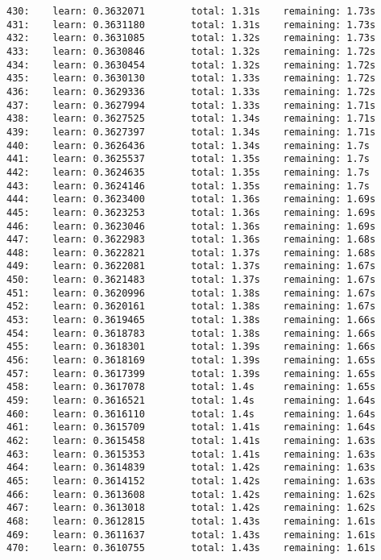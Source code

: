 \documentclass[11pt]{article}
\begin{document}
\begin{Verbatim}[commandchars=\\\{\}]
430:    learn: 0.3632071        total: 1.31s    remaining: 1.73s
431:    learn: 0.3631180        total: 1.31s    remaining: 1.73s
432:    learn: 0.3631085        total: 1.32s    remaining: 1.73s
433:    learn: 0.3630846        total: 1.32s    remaining: 1.72s
434:    learn: 0.3630454        total: 1.32s    remaining: 1.72s
435:    learn: 0.3630130        total: 1.33s    remaining: 1.72s
436:    learn: 0.3629336        total: 1.33s    remaining: 1.72s
437:    learn: 0.3627994        total: 1.33s    remaining: 1.71s
438:    learn: 0.3627525        total: 1.34s    remaining: 1.71s
439:    learn: 0.3627397        total: 1.34s    remaining: 1.71s
440:    learn: 0.3626436        total: 1.34s    remaining: 1.7s
441:    learn: 0.3625537        total: 1.35s    remaining: 1.7s
442:    learn: 0.3624635        total: 1.35s    remaining: 1.7s
443:    learn: 0.3624146        total: 1.35s    remaining: 1.7s
444:    learn: 0.3623400        total: 1.36s    remaining: 1.69s
445:    learn: 0.3623253        total: 1.36s    remaining: 1.69s
446:    learn: 0.3623046        total: 1.36s    remaining: 1.69s
447:    learn: 0.3622983        total: 1.36s    remaining: 1.68s
448:    learn: 0.3622821        total: 1.37s    remaining: 1.68s
449:    learn: 0.3622081        total: 1.37s    remaining: 1.67s
450:    learn: 0.3621483        total: 1.37s    remaining: 1.67s
451:    learn: 0.3620996        total: 1.38s    remaining: 1.67s
452:    learn: 0.3620161        total: 1.38s    remaining: 1.67s
453:    learn: 0.3619465        total: 1.38s    remaining: 1.66s
454:    learn: 0.3618783        total: 1.38s    remaining: 1.66s
455:    learn: 0.3618301        total: 1.39s    remaining: 1.66s
456:    learn: 0.3618169        total: 1.39s    remaining: 1.65s
457:    learn: 0.3617399        total: 1.39s    remaining: 1.65s
458:    learn: 0.3617078        total: 1.4s     remaining: 1.65s
459:    learn: 0.3616521        total: 1.4s     remaining: 1.64s
460:    learn: 0.3616110        total: 1.4s     remaining: 1.64s
461:    learn: 0.3615709        total: 1.41s    remaining: 1.64s
462:    learn: 0.3615458        total: 1.41s    remaining: 1.63s
463:    learn: 0.3615353        total: 1.41s    remaining: 1.63s
464:    learn: 0.3614839        total: 1.42s    remaining: 1.63s
465:    learn: 0.3614152        total: 1.42s    remaining: 1.63s
466:    learn: 0.3613608        total: 1.42s    remaining: 1.62s
467:    learn: 0.3613018        total: 1.42s    remaining: 1.62s
468:    learn: 0.3612815        total: 1.43s    remaining: 1.61s
469:    learn: 0.3611637        total: 1.43s    remaining: 1.61s
470:    learn: 0.3610755        total: 1.43s    remaining: 1.61s

\end{Verbatim}
\end{document}
